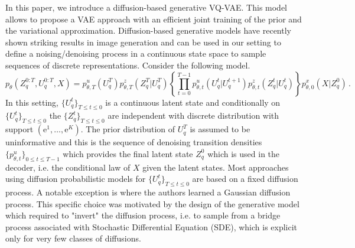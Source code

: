 \documentclass{article}
\newcommand{\rme}{\mathrm{e}}
\begin{document}
In this paper, we introduce a diffusion-based generative VQ-VAE. This model allows to propose a VAE approach with an efficient joint training of the prior and the variational approximation. Diffusion-based generative models have recently shown striking results in image generation and can be used in our setting to define a noising/denoising process in a continuous state space to sample sequences of discrete representations. Consider the following model.
$$
p_{\theta}(Z_q^{0:T},U_q^{0:T}, X) %
= p^u_{\theta,T}(U_q^T) p^z_{\theta,T}(Z_q^T|U_q^T)\left\{\prod_{t=0}^{T-1}p^u_{\theta,t}(U_q^t|U_q^{t+1})p^z_{\theta,t}(Z_q^t|U_q^t)\right\}p^x_{\theta,0}(X|Z^{0}_q)\,.
$$
In this setting, $\{U_q^t\}_{T\leqslant t\leqslant 0}$ is a continuous latent state and conditionally on $\{U_q^t\}_{T\leqslant t\leqslant 0}$ the $\{Z_q^t\}_{T\leqslant t\leqslant 0}$ are independent with discrete distribution with support $(\rme^1,\ldots,\rme^K)$.  The prior distribution of  $U_q^T$ is assumed to be uninformative and this is the sequence of denoising transition densities $\{p^u_{\theta,t}\}_{0\leqslant t\leqslant T-1}$ which provides the final latent state $Z_q^0$ which is used in the decoder, i.e. the conditional law of $X$ given the latent states.
Most approaches \cite{} using diffusion probabilistic models for $\{U_q^t\}_{T\leqslant t\leqslant 0}$ are based on a fixed diffusion process. A notable exception is \cite{} where the authors learned a Gaussian diffusion process. This specific choice was motivated by the design of the generative model which required to "invert" the diffusion process, i.e. to sample from a bridge process associated with Stochastic Differential Equation (SDE), which is explicit only for very few classes of diffusions.
\end{document}
